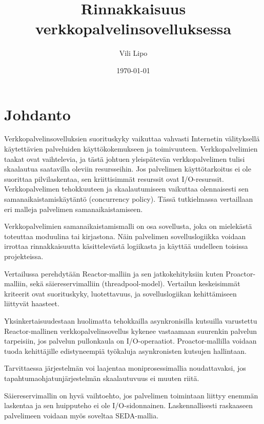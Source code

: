 \documentclass[finnish]{tktltiki2}
\title{Rinnakkaisuus verkkopalvelinsovelluksessa}
\author{Vili Lipo}
\date{\today}
\theoremstyle{definition}
\theoremstyle{remark}
\begin{document}
\frontmatter      %

\maketitle        %
\makeabstract     %

\tableofcontents  %


\mainmatter       %

\section{Johdanto}
Verkkopalvelinsovelluksien suorituskyky vaikuttaa vahvasti
Internetin välityksellä käytettävien palveluiden käyttökokemukseen ja toimivuuteen.
Verkkopalvelimien taakat ovat vaihtelevia, ja tästä johtuen
yleispätevän verkkopalvelimen tulisi skaalautua saatavilla oleviin resursseihin.
Jos palvelimen käyttötarkoitus ei ole suorittaa pilvilaskentaa, sen 
kriittisimmät resurssit ovat I/O-resurssit.
Verkkopalvelimen tehokkuuteen ja skaalautumiseen vaikuttaa olennaisesti
sen samanaikaistamiskäytäntö (concurrency policy). Tässä
tutkielmassa vertaillaan eri malleja palvelimen samanaikaistamiseen.

Verkkopalvelimien samanaikaistamismalli on osa sovellusta,
joka on mielekästä toteuttaa moduulina tai kirjastona.
Näin palvelimen sovelluslogiikka voidaan irrottaa rinnakkaisuutta
käsittelevästä logiikasta ja käyttää uudelleen toisissa projekteissa.

Vertailussa perehdytään Reactor-malliin ja sen jatkokehityksiin kuten Proactor-malliin,
sekä säiereservimalliin (threadpool-model).
Vertailun keskeisimmät kriteerit ovat suorituskyky, luotettavuus, ja 
sovelluslogiikan kehittämiseen liittyvät haasteet.

Yksinkertaisuudestaan huolimatta tehokkailla asynkronisilla
kutsuilla varustettu Reactor-mallinen verkkopalvelinsovellus 
kykenee vastaamaan suurenkin palvelun tarpeisiin, jos palvelun 
pullonkaula on I/O-operaatiot.
Proactor-mallilla voidaan tuoda kehittäjille edistyneempiä työkaluja
asynkronisten kutsujen hallintaan.

Tarvittaessa järjestelmän voi laajentaa moniprosessimallia noudattavaksi,
jos tapahtumaohjatunjärjestelmän skaalautuvuus ei muuten riitä.

Säiereservimallin on hyvä vaihtoehto, jos palvelimen
toimintaan liittyy enemmän laskentaa ja sen huipputeho ei ole I/O-sidonnainen.
Laskennallisesti raskaaseen palvelimeen voidaan myös soveltaa SEDA-mallia.
\end{document}
